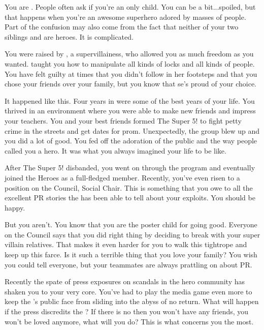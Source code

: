 \documentclass[char]{LRSguildcamp1}
\begin{document}
\name{\cYoungest{}}

You are \cYoungest{\MYsupername}. People often ask if you're an only child. You can be a bit...spoiled, but that happens when you're an awesome superhero adored by masses of people. Part of the confusion may also come from the fact that neither of your two siblings \cOldest{} and \cArchitect{} are heroes. It is complicated.  

You were raised by \cGrandma{\MYsupername}, a supervillainess, who allowed you as much freedom as you wanted. \cGrandma{} taught you how to manipulate all kinds of locks and all kinds of people. You have felt guilty at times that you didn't follow in her footsteps and that you chose your friends over your family, but you know that se's proud of your choice. 

It happened like this. Four years in \pSuperSchool{} were some of the best years of your life. You thrived in an environment where you were able to make new friends and impress your teachers. You and your best friends formed The Super 5! to fight petty crime in the streets and get dates for prom. Unexpectedly, the group blew up and you did a lot of good. You fed off the adoration of the public and the way people called you a hero. It was what you always imagined your life to be like.  
 
After The Super 5! disbanded, you went on through the \cHeroLeague{\intro} program and eventually joined the Heroes as a full-fledged member. Recently, you've even risen to a position on the Council, Social Chair. This is something that you owe to all the excellent PR stories the \cHeroLeague{} has been able to tell about your exploits. You should be happy. 

But you aren't. You know that you are the poster child for going good. Everyone on the Council says that you did right thing by deciding to break with your super villain relatives. That makes it even harder for you to walk this tightrope and keep up this farce. Is it such a terrible thing that you love your family? 
You wish you could tell everyone, but your teammates are always prattling on about PR. 

Recently the spate of press exposures on scandals in the hero community has shaken you to your very core. You've had to play the media game even more to keep the \cHeroLeague{}'s public face from sliding into the abyss of no return. What will happen if the press discredits the \cHeroLeague{}? If there is no \cHeroLeague{} then you won't have any friends, you won't be loved anymore, what will you do? This is what concerns you the most. 
\end{document}
